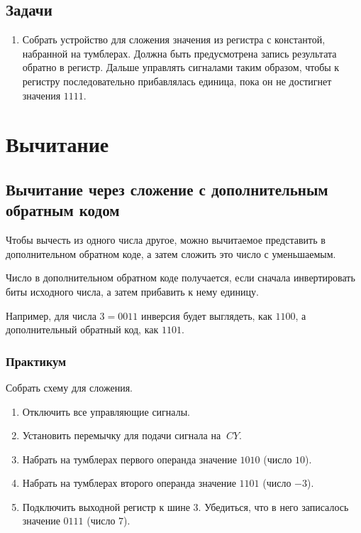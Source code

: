\subsection{Задачи}

\begin{enumerate}
    \item Собрать устройство для сложения значения из регистра с константой, набранной на тумблерах.
          Должна быть предусмотрена запись результата обратно в регистр.
          Дальше управлять сигналами таким образом, чтобы к регистру последовательно
          прибавлялась единица, пока он не достигнет значения $1111$.
\end{enumerate}



\section{Вычитание}

\subsection{Вычитание через сложение с дополнительным обратным кодом}

Чтобы вычесть из одного числа другое, можно вычитаемое представить в дополнительном обратном
коде, а затем сложить это число с уменьшаемым.

Число в дополнительном обратном коде получается, если сначала инвертировать биты исходного
числа, а затем прибавить к нему единицу.

Например, для числа $3=0011$ инверсия будет выглядеть, как $1100$, а дополнительный обратный код, как $1101$.

\subsubsection{Практикум}

Собрать схему для сложения.

\begin{enumerate}
    \item Отключить все управляющие сигналы.
    \item Установить перемычку для подачи сигнала на $~CY$.
    \item Набрать на тумблерах первого операнда значение $1010$ (число $10$).
    \item Набрать на тумблерах второго операнда значение $1101$ (число $-3$).
    \item Подключить выходной регистр к шине $3$. Убедиться, что в него записалось значение $0111$ (число $7$).
\end{enumerate}

